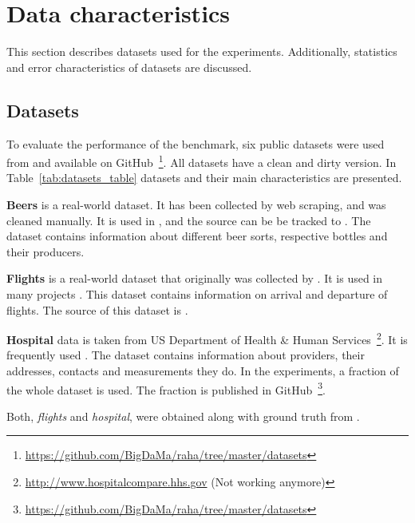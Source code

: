 \section{Data characteristics}
\label{sec:data_charcteristics}

This section describes datasets used for the experiments.
Additionally, statistics and error characteristics of datasets are discussed.

\subsection{Datasets}



To evaluate the performance of the benchmark, six public datasets were used from \textcite{MahdaviAFMQST2019, MahdaviA2020} and available on GitHub~\footnote{\url{https://github.com/BigDaMa/raha/tree/master/datasets}}.
All datasets have a clean and dirty version.
In Table~\ref{tab:datasets_table} datasets and their main characteristics are presented.

\textbf{Beers} is a real-world dataset. It has been collected by web scraping, and was cleaned manually.
It is used in \textcite{MahdaviAFMQST2019, MahdaviA2020},
and the source can be be tracked to \textcite{Hould2017WEB, Hould2017KAGGLE}. 
The dataset contains information about different beer sorts, respective bottles and their producers.

\textbf{Flights} is a real-world dataset that originally was collected by \textcite{LiDLMS2015}. 
It is used in many projects \cite{holodetect, raha, LiDLMS2015}.
This dataset contains information on arrival and departure of flights.
The source of this dataset is \textcite{LiDLMS2015}.

\textbf{Hospital} data is taken from US Department of Health \& Human Services~\footnote{\url{http://www.hospitalcompare.hhs.gov} (Not working anymore)}. 
It is frequently used \cite{RestatGCS2022, ChuIP2013, DallachiesaEEEIOT2013, HeidariMIR2019,MahdaviAFMQST2019, MahdaviA2020, RekatsinasCIR2017}.
The dataset contains information about providers, their addresses, contacts and measurements they do.
In the experiments, a fraction of the whole dataset is used.
The fraction is published in GitHub~\footnote{\url{https://github.com/BigDaMa/raha/tree/master/datasets}}.

Both, \textit{flights} and \textit{hospital}, were obtained along with ground truth from \textcite{holodetect}.

